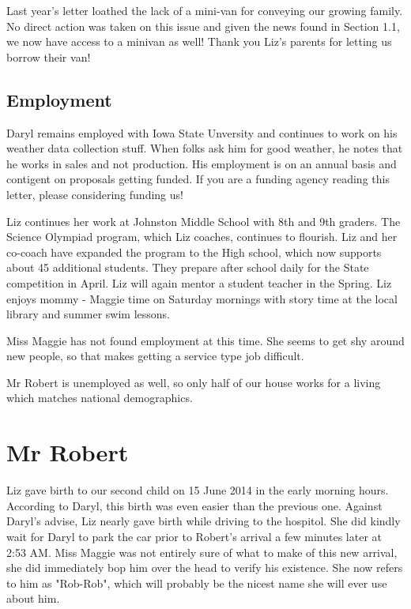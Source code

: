 \documentclass{article}
\begin{document}
\begin{multicols}{2}
Last year's letter loathed the lack of a mini-van for conveying our 
growing family.  No direct action was taken on this issue and given the 
news found in Section 1.1, we now have access to a minivan as well!  Thank 
you Liz's parents for letting us borrow their van!

\subsection{Employment}
Daryl remains employed with Iowa State Unversity and continues to work on 
his weather data collection stuff.  When folks ask him for good weather, 
he notes that he works in sales and not production.  His employment is on 
an annual basis and contigent on proposals getting funded.  If you are a 
funding agency reading this letter, please considering funding us!

Liz continues her work at Johnston Middle School with 8th and 9th graders. 
The Science Olympiad program, which Liz coaches, continues to flourish. 
Liz and her co-coach have expanded the program to the High school, which 
now supports about 45 additional students.  They prepare after school 
daily for the State competition in April.  Liz will again mentor a student 
teacher in the Spring.  Liz enjoys mommy - Maggie time on Saturday 
mornings with story time at the local library and summer swim lessons.

Miss Maggie has not found employment at this time.  She seems to get shy 
around new people, so that makes getting a service type job difficult.  

Mr Robert is unemployed as well, so only half of our house works for a 
living which matches national demographics.

\section{Mr Robert}

Liz gave birth to our second child on 15 June 2014 in the early morning 
hours.  According to Daryl, this birth was even easier than the previous 
one.  Against Daryl's advise, Liz nearly gave birth while driving to the 
hospitol.  She did kindly wait for Daryl to park the car prior to Robert's 
arrival a few minutes later at 2:53 AM.  Miss Maggie was not entirely sure 
of what to make of this new arrival, she did immediately bop him over the 
head to verify his existence.  She now refers to him as "Rob-Rob", which 
will probably be the nicest name she will ever use about him.  


\end{multicols}
\end{document}
